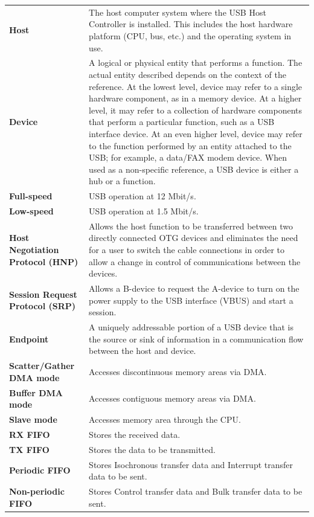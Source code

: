 \documentclass[main\_\_EN.tex]{subfiles}
\begin{document}
\begin{longtable}[c]{ R{5cm} p{10cm} }
\textbf{Host}     & The host computer system where the USB Host Controller is installed. This includes the host hardware platform (CPU, bus, etc.) and the operating system in use.\\
\textbf{Device}   & A logical or physical entity that performs a function. The actual entity described depends on the context of the reference. At the lowest level, device may refer to a single hardware component, as in a memory device. At a higher level, it may refer to a collection of hardware components that perform a particular function, such as a USB interface device. At an even higher level, device may refer to the function performed by an entity attached to the USB; for example, a data/FAX modem device. When used as a non-specific reference, a USB device is either a hub or a function.\\
\textbf{Full-speed}  & USB operation at 12 Mbit/s.\\
\textbf{Low-speed} & USB operation at 1.5 Mbit/s.\\
\textbf{Host Negotiation Protocol (HNP)} & Allows the host function to be transferred between two directly connected OTG devices and eliminates the need for a user to switch the cable connections in order to allow a change in control of communications between the devices. \\
\textbf{Session Request Protocol (SRP)} & Allows a B-device to request the A-device to turn on the power supply to the USB interface (VBUS) and start a session. \\
\textbf{Endpoint} & A uniquely addressable portion of a USB device that is the source or sink of information in a communication flow between the host and device.\\
\textbf{Scatter/Gather DMA mode} & Accesses discontinuous memory areas via DMA. \\
\textbf{Buffer DMA mode} & Accesses contiguous memory areas via DMA.\\
\textbf{Slave mode} & Accesses memory area through the CPU. \\
\textbf{RX FIFO} & Stores the received data.\\
\textbf{TX FIFO} & Stores the data to be transmitted.\\
\textbf{Periodic FIFO} & Stores Isochronous transfer data and Interrupt transfer data to be sent.\\
\textbf{Non-periodic FIFO} & Stores Control transfer data and Bulk transfer data to be sent.\\
\end{longtable}
\end{document}
